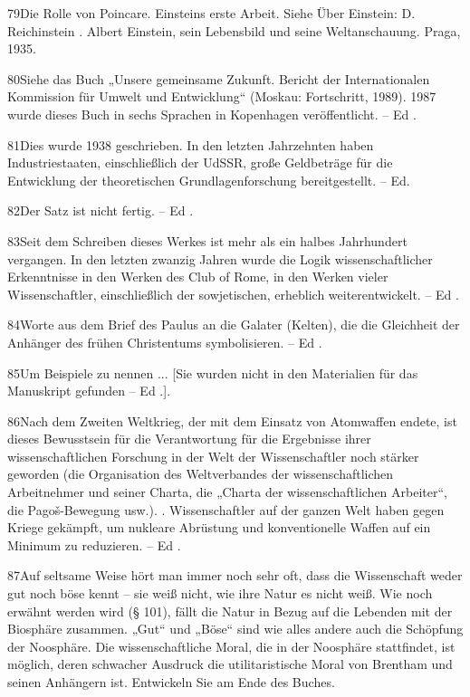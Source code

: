 \documentclass[11pt,a4paper]{book}
\begin{document}
79Die Rolle von Poincare. Einsteins erste Arbeit. Siehe Über Einstein: D. Reichinstein . Albert Einstein, sein Lebensbild und seine Weltanschauung. Praga, 1935.



80Siehe das Buch „Unsere gemeinsame Zukunft. Bericht der Internationalen Kommission für Umwelt und Entwicklung“ (Moskau: Fortschritt, 1989). 1987 wurde dieses Buch in sechs Sprachen in Kopenhagen veröffentlicht. -- Ed .



81Dies wurde 1938 geschrieben. In den letzten Jahrzehnten haben Industriestaaten, einschließlich der UdSSR, große Geldbeträge für die Entwicklung der theoretischen Grundlagenforschung bereitgestellt. -- Ed.



82Der Satz ist nicht fertig. -- Ed .



83Seit dem Schreiben dieses Werkes ist mehr als ein halbes Jahrhundert vergangen. In den letzten zwanzig Jahren wurde die Logik wissenschaftlicher Erkenntnisse in den Werken des Club of Rome, in den Werken vieler Wissenschaftler, einschließlich der sowjetischen, erheblich weiterentwickelt. -- Ed .



84Worte aus dem Brief des Paulus an die Galater (Kelten), die die Gleichheit der Anhänger des frühen Christentums symbolisieren. -- Ed .



85Um Beispiele zu nennen ... [Sie wurden nicht in den Materialien für das Manuskript gefunden -- Ed .].



86Nach dem Zweiten Weltkrieg, der mit dem Einsatz von Atomwaffen endete, ist dieses Bewusstsein für die Verantwortung für die Ergebnisse ihrer wissenschaftlichen Forschung in der Welt der Wissenschaftler noch stärker geworden (die Organisation des Weltverbandes der wissenschaftlichen Arbeitnehmer und seiner Charta, die „Charta der wissenschaftlichen Arbeiter“, die Pagoš-Bewegung usw.). . Wissenschaftler auf der ganzen Welt haben gegen Kriege gekämpft, um nukleare Abrüstung und konventionelle Waffen auf ein Minimum zu reduzieren. -- Ed .



87Auf seltsame Weise hört man immer noch sehr oft, dass die Wissenschaft weder gut noch böse kennt -- sie weiß nicht, wie ihre Natur es nicht weiß. Wie noch erwähnt werden wird (§ 101), fällt die Natur in Bezug auf die Lebenden mit der Biosphäre zusammen. „Gut“ und „Böse“ sind wie alles andere auch die Schöpfung der Noosphäre. Die wissenschaftliche Moral, die in der Noosphäre stattfindet, ist möglich, deren schwacher Ausdruck die utilitaristische Moral von Brentham und seinen Anhängern ist. Entwickeln Sie am Ende des Buches.
\end{document}
